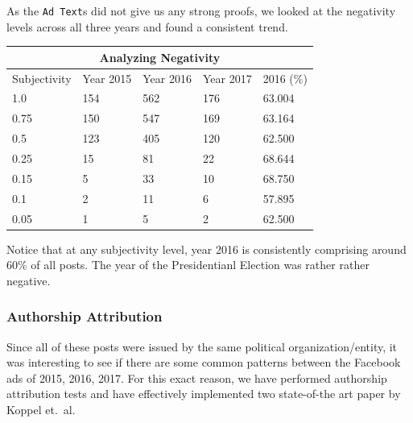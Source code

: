 \documentclass[12pt]{article}
\theoremstyle{definition}
\begin{document}
\bigskip

As the \texttt{Ad Text}s did not give us any strong proofs, we looked at the
negativity levels across all three years and found a consistent trend.

\bigskip

\begin{center}
\begin{tabular}{|p{3cm}|p{3cm}|p{3cm}|p{3cm}|p{3cm}|}
 \hline
 \multicolumn{5}{|c|}{Analyzing Negativity}\\
 \hline
 Subjectivity & Year 2015 & Year 2016 & Year 2017 & 2016 (\%)\\
 \hline
 1.0  & 154 & 562 & 176 & 63.004\\
 \hline
 0.75 & 150 & 547 & 169 & 63.164\\
 \hline
 0.5  & 123 & 405 & 120 & 62.500\\
 \hline
 0.25 & 15  & 81  & 22  & 68.644\\
 \hline
 0.15 & 5   & 33  & 10  & 68.750\\
 \hline
 0.1  & 2   & 11  & 6   & 57.895\\
 \hline
 0.05 & 1   & 5   & 2   & 62.500\\
 \hline
\end{tabular}
\end{center}

\bigskip

Notice that at any subjectivity level, year 2016 is consistently comprising
around 60\% of all posts. The year of the Presidentianl Election was rather
rather negative.


\subsubsection*{\centering Authorship Attribution}

Since all of these posts were issued by the same political organization/entity,
it was interesting to see if there are some common patterns between the
Facebook ads of 2015, 2016, 2017. For this exact reason, we have performed
authorship attribution tests and have effectively implemented two
state-of-the art paper by Koppel et.~al.


\newpage

\begin{center}
\printbibliography[heading=bibintoc]
\end{center}

\end{document}
